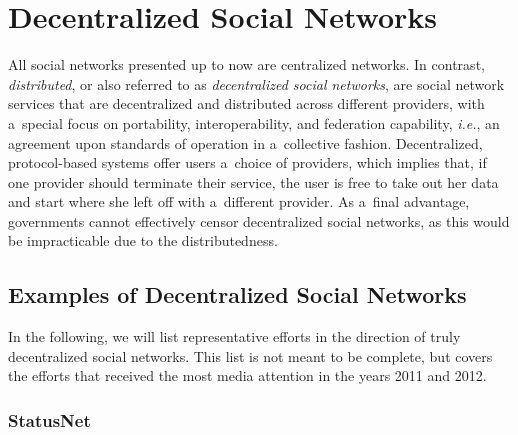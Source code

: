 \section{Decentralized Social Networks}
All social networks presented up to now are centralized networks.
In contrast, \emph{distributed}, or also referred to as
\emph{decentralized social networks}, are
social network services that are decentralized and distributed
across different providers, with a~special focus on
portability, interoperability, and federation capability,
\emph{i.e.}, an agreement upon standards of operation
in a~collective fashion.
Decentralized, protocol-based systems
offer users a~choice of providers, which implies
that, if one provider should terminate their service,
the user is free to take out her data and start
where she left off with a~different provider.
As a~final advantage, governments cannot effectively censor
decentralized social networks,
as this would be impracticable due to the distributedness.

\subsection{Examples of Decentralized Social Networks}

In the following, we will list representative efforts 
in the direction of truly decentralized social networks.
This list is not meant to be complete,
but covers the efforts that received the most media attention
in the years 2011 and 2012.

\subsubsection{StatusNet}

